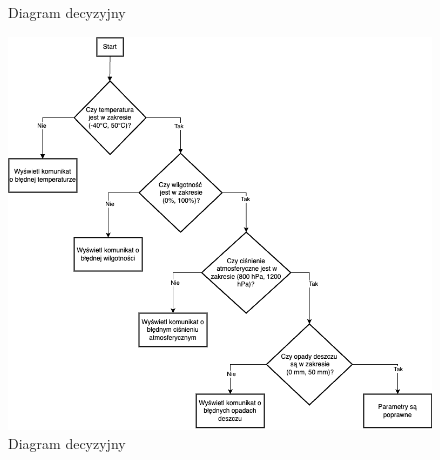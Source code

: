 \documentclass{article}
\begin{document}
\begin{figure}
    \centering
    \begin{minipage}{0.6\textwidth}
        \centering
        \large Diagram decyzyjny
    \end{minipage}
    \includegraphics[scale=0.5]{4.1.1.png}
    \caption{Diagram decyzyjny}
    \label{etykieta13}
\end{figure}
\end{document}
